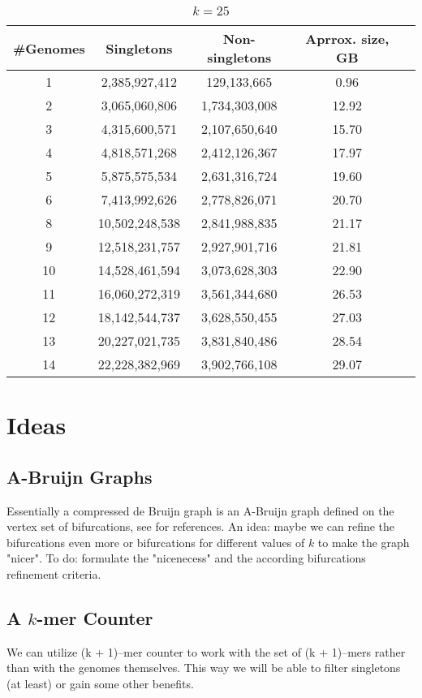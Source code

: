 \documentclass[a4paper, 12pt]{scrartcl}
\begin{document}
\begin{table}[h]
\begin{center}
\caption{$k = 25$}
\begin{tabular}{ccccc}
\hline
\#Genomes  & Singletons & Non-singletons & Aprrox. size, GB  &\\
\hline
1 & 2,385,927,412 & 129,133,665 & 0.96 \\
2 & 3,065,060,806 & 1,734,303,008 & 12.92 \\
3 & 4,315,600,571 & 2,107,650,640 & 15.70\\
4 & 4,818,571,268 & 2,412,126,367 & 17.97\\
5 & 5,875,575,534 & 2,631,316,724 & 19.60\\
6 & 7,413,992,626 & 2,778,826,071 & 20.70\\
8 & 10,502,248,538 & 2,841,988,835 & 21.17\\
9 & 12,518,231,757 & 2,927,901,716 & 21.81\\
10 & 14,528,461,594 & 3,073,628,303 & 22.90\\
11 & 16,060,272,319 & 3,561,344,680 & 26.53\\
12 & 18,142,544,737 & 3,628,550,455 & 27.03\\
13 & 20,227,021,735 & 3,831,840,486 & 28.54\\
14 & 22,228,382,969 & 3,902,766,108 & 29.07\\
\hline
\end{tabular}

\end{center}
\end{table}

\section{Ideas}
\subsection{A-Bruijn Graphs}
Essentially a compressed de Bruijn graph is an A-Bruijn graph defined on the vertex set of bifurcations, see \cite{lin2014manifold} for references.
An idea: maybe we can refine the bifurcations even more or bifurcations for different values of $k$ to make the graph "nicer".
To do: formulate the "nicenecess" and the according bifurcations refinement criteria.
\subsection{A $k$-mer Counter}
We can utilize (k + 1)--mer counter to work with the set of (k + 1)--mers rather than with the genomes themselves.
This way we will be able to filter singletons (at least) or gain some other benefits.
\begin{spacing}{0.9}


\end{spacing}
\end{document}
